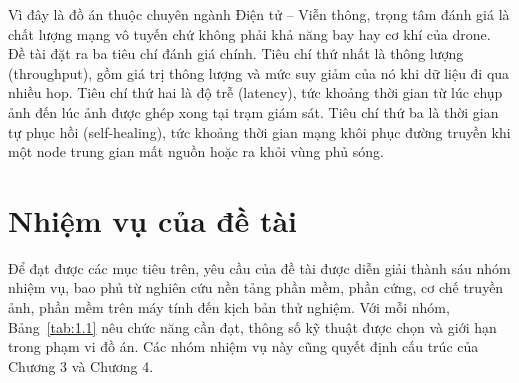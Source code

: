 Vì đây là đồ án thuộc chuyên ngành Điện tử – Viễn thông, trọng tâm đánh giá là chất lượng mạng vô tuyến chứ không phải khả năng bay hay cơ khí của drone. Đề tài đặt ra ba tiêu chí đánh giá chính. Tiêu chí thứ nhất là thông lượng (throughput), gồm giá trị thông lượng và mức suy giảm của nó khi dữ liệu đi qua nhiều hop. Tiêu chí thứ hai là độ trễ (latency), tức khoảng thời gian từ lúc chụp ảnh đến lúc ảnh được ghép xong tại trạm giám sát. Tiêu chí thứ ba là thời gian tự phục hồi (self-healing), tức khoảng thời gian mạng khôi phục đường truyền khi một node trung gian mất nguồn hoặc ra khỏi vùng phủ sóng.


\section{Nhiệm vụ của đề tài}\label{sec:1.3}

Để đạt được các mục tiêu trên, yêu cầu của đề tài được diễn giải thành sáu nhóm nhiệm vụ, bao phủ từ nghiên cứu nền tảng phần mềm, phần cứng, cơ chế truyền ảnh, phần mềm trên máy tính đến kịch bản thử nghiệm. Với mỗi nhóm, Bảng~\ref{tab:1.1} nêu chức năng cần đạt, thông số kỹ thuật được chọn và giới hạn trong phạm vi đồ án. Các nhóm nhiệm vụ này cũng quyết định cấu trúc của Chương 3 và Chương 4.


